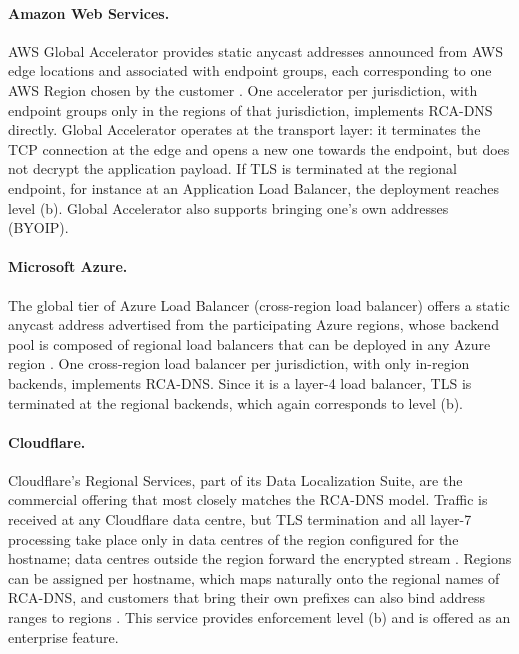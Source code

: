 \documentclass[
A4paper,                %
twoside,                %
openright,              %
chapterprefix=true,     %
12pt,                   %
headings=normal,        %
titlepage=on            %
]{book}
\begin{document}
\paragraph{Amazon Web Services.} AWS Global Accelerator provides static anycast addresses announced from AWS edge locations and associated with endpoint groups, each corresponding to one AWS Region chosen by the customer \cite{HowAccelerator}. One accelerator per jurisdiction, with endpoint groups only in the regions of that jurisdiction, implements RCA-DNS directly. Global Accelerator operates at the transport layer: it terminates the TCP connection at the edge and opens a new one towards the endpoint, but does not decrypt the application payload. If TLS is terminated at the regional endpoint, for instance at an Application Load Balancer, the deployment reaches level (b). Global Accelerator also supports bringing one's own addresses (BYOIP).

\paragraph{Microsoft Azure.} The global tier of Azure Load Balancer (cross-region load balancer) offers a static anycast address advertised from the participating Azure regions, whose backend pool is composed of regional load balancers that can be deployed in any Azure region \cite{GlobalLearn}. One cross-region load balancer per jurisdiction, with only in-region backends, implements RCA-DNS. Since it is a layer-4 load balancer, TLS is terminated at the regional backends, which again corresponds to level (b).

\paragraph{Cloudflare.} Cloudflare's Regional Services, part of its Data Localization Suite, are the commercial offering that most closely matches the RCA-DNS model. Traffic is received at any Cloudflare data centre, but TLS termination and all layer-7 processing take place only in data centres of the region configured for the hostname; data centres outside the region forward the encrypted stream \cite{RegionalDocs}. Regions can be assigned per hostname, which maps naturally onto the regional names of RCA-DNS, and customers that bring their own prefixes can also bind address ranges to regions \cite{RegionalizedDocs}. This service provides enforcement level (b) and is offered as an enterprise feature.
\end{document}
